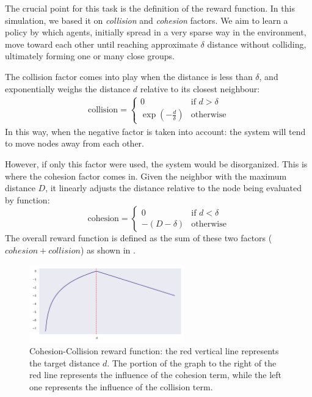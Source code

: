 The crucial point for this task is
 the definition of the reward function. 
 In this simulation, we based it on \emph{collision} and \emph{cohesion} factors. 
%
We aim to learn a policy by which agents, initially spread in a very sparse way in the environment, move toward each other until reaching approximate $\delta$  distance without colliding, ultimately forming one or many close groups.
%

The collision factor comes into play when the distance is less than $\delta$, 
 and exponentially weighs the distance $d$ relative to its closest neighbour:
\begin{equation}
    \label{eq:collision-factor}
    \begin{split}
        \text{collision} = \begin{cases}
            0 & \text{if } d > \delta \\
            \exp\left(-\frac{d}{\delta}\right) & \text{otherwise}
        \end{cases}
    \end{split}
\end{equation}
In this way, when the negative factor is taken into account: 
 the system will tend to move nodes away from each other.

However, if only this factor were used, 
 the system would be disorganized. 
 This is where the cohesion factor comes in. 
 Given the neighbor with the maximum distance $D$, 
 it linearly adjusts the distance relative to the node being evaluated by function:
\begin{equation}
    \text{cohesion} = \begin{cases}
        0 & \text{if } d < \delta \\
        -(D - \delta) & \text{otherwise}
    \end{cases}
\end{equation}
%
The overall reward function is defined as the sum of these two factors ($cohesion + collision$)
 as shown in .
 \begin{figure}[t]
    \centering
    \includegraphics[width=0.6\textwidth]{papers/coordination2023/imgs/ccreward.pdf}
    \caption{Cohesion-Collision reward function: the red vertical line represents the target distance $d$.
        The portion of the graph to the right of the red line represents the influence of the cohesion term,
        while the left one represents the influence of the collision term.
    }
    \label{fig:cc-rf}
\end{figure}


